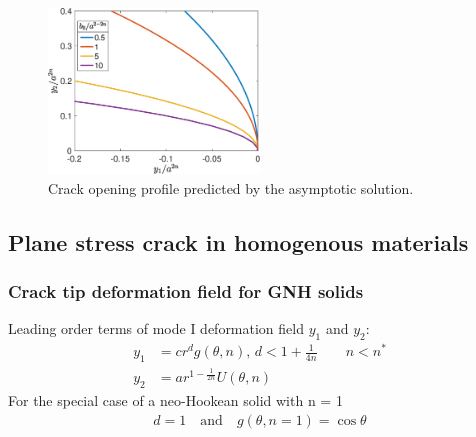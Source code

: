 \documentclass[12pt,3p]{article}
\numberwithin{equation}{section}
\begin{document}
\begin{figure}[h!]
	\centering
        \includegraphics[width=0.5\textwidth]{Fig4A.eps}
        \caption{Crack opening profile predicted by the asymptotic solution.}
\end{figure}

\subsection{Plane stress crack in homogenous materials}

\subsubsection{Crack tip deformation field for GNH solids}
Leading order terms of mode I deformation field $y_1$ and $y_2$: 
\begin{align}
y_1 &= c r^d g (\theta, n), \, d < 1 + \frac{1}{4n} \quad \quad n < n^* \\
y_2 &= a r^{1-\frac{1}{2n}} U(\theta, n)
\end{align}
For the special case of a neo-Hookean solid with n = 1 
\begin{align}
d = 1 \quad \text{and} \quad g(\theta, n = 1) = \cos \theta
\end{align}

\end{document}

